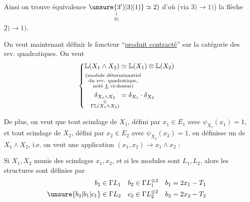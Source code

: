 
Ainsi on trouve équivalence $\underset{\substack{\wr\\3)}}{\unsure{3')|3)|1)}}\simeq2)$ d'où  (via $3)\longrightarrow1)$) la flèche $2)\longrightarrow1)$.

On veut maintenant définir le foncteur ``\uline{produit contracté}'' sur la catégorie des rev. quadratiques. On veut
\[
\left\{\begin{aligned}\mathbb L(X_1\wedge X_2)&\simeq\mathbb L(X_1)\otimes\mathbb L(X_2)\\ &\hspace{-5em}\substack{\text{(module déterminantiel}\\\text{du rev. quadratique,}\\\text{noté }\underline L\text{ ci-dessus)}}\\ \underset{\substack{\in\\\Gamma\mathbb L(X_1\wedge X_2)}}{\delta_{X_1\wedge X_2}}&=\delta_{X_1}\cdot\delta_{X_2}\end{aligned}\right.
\]

De plus, on veut que tout scindage de $X_1$,  défini par $x_1\in E_1$ avec $\psi_{X_1}(x_1)=1$, et tout scindage de $X_2$, défini par $x_2\in E_2$ avec $\psi_{X_2}(x_2)=1$, en définisse un de $X_1\wedge X_2$, i.e. on veut une application
$(x_1,x_2)\longrightarrow x_1\wedge x_2$ :

Si $X_1,X_2$ munis des scindages $x_1,x_2$, et si les modules   sont $L_1,L_2$, alors les structures sont définies par
\[
\begin{aligned}b_1&\in\Gamma L_1&b_2&\in\Gamma L_1^{\otimes2}&b_1&=2x_1-T_1\\ \unsure{b_2|b_1|c_1}&\in\Gamma L_2&c_2&\in\Gamma L_2^{\otimes2}&b_2&=2x_2-T_2\end{aligned}
\]

